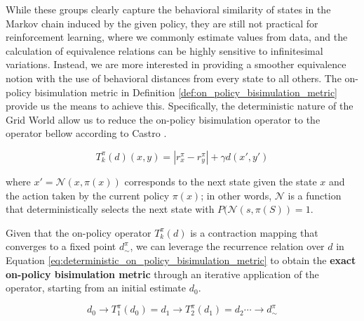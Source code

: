 
While these groups clearly capture the behavioral similarity of states in the Markov chain induced by the given policy, they are still not practical for reinforcement learning, where we commonly estimate values from data, and the calculation of equivalence relations can be highly sensitive to infinitesimal variations. Instead, we are more interested in providing a smoother equivalence notion with the use of behavioral distances from every state to all others. The on-policy bisimulation metric in Definition \ref{def:on_policy_bisimulation_metric} provide us the means to achieve this. Specifically, the deterministic nature of the Grid World allow us to reduce the on-policy bisimulation operator to the operator bellow according to Castro \cite{castro2020scalable}.

\begin{equation}
    \label{eq:deterministic_on_policy_bisimulation_metric}
    T^\pi_k(d)(x, y) = |r^\pi_x - r^\pi_{y}| + \gamma d(x',y') 
\end{equation}

where $x' = \mathcal{N}(x,\pi(x))$ corresponds to the next state given the state $x$ and the action taken by the current policy $\pi(x)$; in other words, $\mathcal{N}$ is a function that deterministically selects the next state with $P(\mathcal{N}(s,\pi(S)) = 1$.

Given that the on-policy operator $T^\pi_k(d)$ is a contraction mapping that converges to a fixed point \(d^\pi_\sim\), we can leverage the recurrence relation over \(d\) in Equation \ref{eq:deterministic_on_policy_bisimulation_metric} to obtain the \textbf{exact on-policy bisimulation metric} through an iterative application of the operator, starting from an initial estimate \(d_0\).

$$d_0 \rightarrow T^\pi_1(d_0) = d_1 \rightarrow T^\pi_2(d_1) = d_2 \cdots \rightarrow d^\pi_\sim$$

